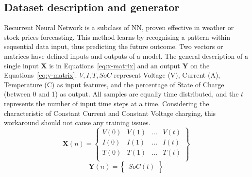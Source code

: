 \subsection{Dataset description and generator} \label{subsec:dataset}
%
Recurrent Neural Network is a subclass of NN, proven effective in weather or stock prices forecasting.
This method learns by recognising a pattern within sequential data input, thus predicting the future outcome.
Two vectors or matrices have defined inputs and outputs of a model.
The general description of a single input \textbf{X} is in \mbox{Equations~\ref{eq:x-matrix}} and an output \textbf{Y} on the \mbox{Equations~\ref{eq:y-matrix}}.
$V, I, T, SoC$ represent Voltage (V), Current (A), Temperature (\textdegree{}C) as input features, and the percentage of State of Charge (between 0 and 1) as output.
All samples are equally time distributed, and the $t$ represents the number of input time steps at a time.
Considering the characteristic of Constant Current and Constant Voltage charging, this workaround should not cause any training issues.
\begin{equation}
    \textbf{X} \left (n  \right ) =
    \begin{Bmatrix}
        V \left (0  \right ) & V \left (1  \right ) & ... & V \left (t  \right )\\ 
        I \left (0  \right ) & I \left (1  \right ) & ... & I \left (t  \right )\\ 
        T \left (0  \right ) & T \left (1  \right ) & ... & T \left (t  \right )\\
    \end{Bmatrix}
    \label{eq:x-matrix}
\end{equation}
\begin{equation}
    \textbf{Y} \left (n  \right ) =
    \begin{Bmatrix}
        SoC \left (t  \right ) 
    \end{Bmatrix}
    \label{eq:y-matrix}
\end{equation}

